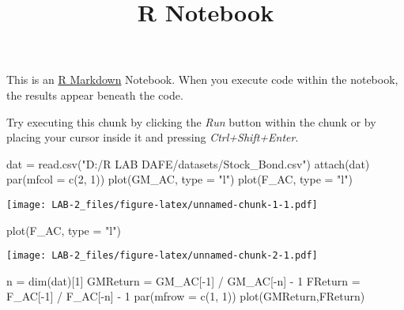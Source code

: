 \documentclass[
]{article}
\title{R Notebook}
\author{}
\date{\vspace{-2.5em}}
\newenvironment{Shaded}{\begin{snugshade}}{\end{snugshade}}
\newcommand{\AttributeTok}[1]{\textcolor[rgb]{0.77,0.63,0.00}{#1}}
\newcommand{\DecValTok}[1]{\textcolor[rgb]{0.00,0.00,0.81}{#1}}
\newcommand{\FunctionTok}[1]{\textcolor[rgb]{0.00,0.00,0.00}{#1}}
\newcommand{\NormalTok}[1]{#1}
\newcommand{\OtherTok}[1]{\textcolor[rgb]{0.56,0.35,0.01}{#1}}
\newcommand{\SpecialCharTok}[1]{\textcolor[rgb]{0.00,0.00,0.00}{#1}}
\newcommand{\StringTok}[1]{\textcolor[rgb]{0.31,0.60,0.02}{#1}}
\begin{document}
\maketitle

This is an \href{http://rmarkdown.rstudio.com}{R Markdown} Notebook.
When you execute code within the notebook, the results appear beneath
the code.

Try executing this chunk by clicking the \emph{Run} button within the
chunk or by placing your cursor inside it and pressing
\emph{Ctrl+Shift+Enter}.

\begin{Shaded}
\begin{Highlighting}[]
\NormalTok{dat }\OtherTok{=} \FunctionTok{read.csv}\NormalTok{(}\StringTok{"D:/R LAB DAFE/datasets/Stock\_Bond.csv"}\NormalTok{)}
\FunctionTok{attach}\NormalTok{(dat)}
\FunctionTok{par}\NormalTok{(}\AttributeTok{mfcol =} \FunctionTok{c}\NormalTok{(}\DecValTok{2}\NormalTok{, }\DecValTok{1}\NormalTok{))}
\FunctionTok{plot}\NormalTok{(GM\_AC, }\AttributeTok{type =} \StringTok{"l"}\NormalTok{)}
\FunctionTok{plot}\NormalTok{(F\_AC, }\AttributeTok{type =} \StringTok{"l"}\NormalTok{)}
\end{Highlighting}
\end{Shaded}

\texttt{[image: LAB-2\_files/figure-latex/unnamed-chunk-1-1.pdf]}

\begin{Shaded}
\begin{Highlighting}[]
\FunctionTok{plot}\NormalTok{(F\_AC, }\AttributeTok{type =} \StringTok{"l"}\NormalTok{)}
\end{Highlighting}
\end{Shaded}

\texttt{[image: LAB-2\_files/figure-latex/unnamed-chunk-2-1.pdf]}

\begin{Shaded}
\begin{Highlighting}[]
\NormalTok{n }\OtherTok{=} \FunctionTok{dim}\NormalTok{(dat)[}\DecValTok{1}\NormalTok{]}
\NormalTok{GMReturn }\OtherTok{=}\NormalTok{ GM\_AC[}\SpecialCharTok{{-}}\DecValTok{1}\NormalTok{] }\SpecialCharTok{/}\NormalTok{ GM\_AC[}\SpecialCharTok{{-}}\NormalTok{n] }\SpecialCharTok{{-}} \DecValTok{1}
\NormalTok{FReturn }\OtherTok{=}\NormalTok{ F\_AC[}\SpecialCharTok{{-}}\DecValTok{1}\NormalTok{] }\SpecialCharTok{/}\NormalTok{ F\_AC[}\SpecialCharTok{{-}}\NormalTok{n] }\SpecialCharTok{{-}} \DecValTok{1}
\FunctionTok{par}\NormalTok{(}\AttributeTok{mfrow =} \FunctionTok{c}\NormalTok{(}\DecValTok{1}\NormalTok{, }\DecValTok{1}\NormalTok{))}
\FunctionTok{plot}\NormalTok{(GMReturn,FReturn)}
\end{Highlighting}
\end{Shaded}
\end{document}
